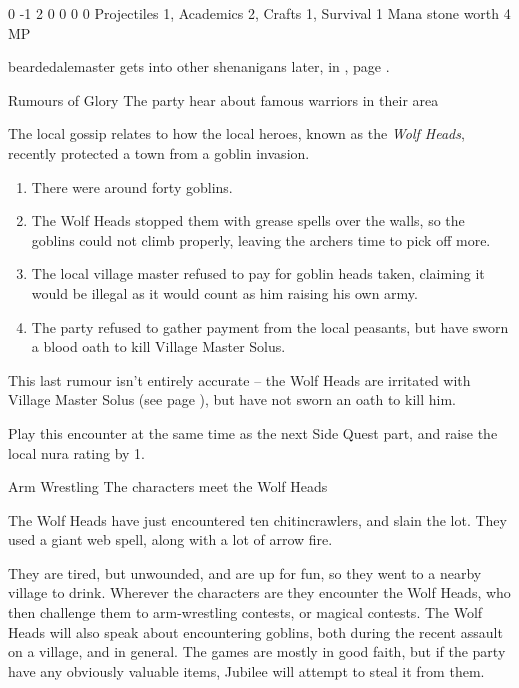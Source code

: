 \begin{multicols}{2}
{0}%
{-1}%
{{2}%
{0}%
{0}}%
{0}%
{0}%
{Projectiles 1, Academics 2, Crafts 1, Survival 1\knacks{\combatcaster}
}%
{Mana stone worth 4 MP}%
{}

\beardedalemaster
\label{beardedalemaster}

\Gls{beardedalemaster} gets into other shenanigans later, in , page \pageref{troubleAle}.

{\N Rumours of Glory}%
{The party hear about famous warriors in their area}%

The local gossip relates to how the local heroes, known as the \textit{Wolf Heads}, recently protected a town from a goblin invasion.

\begin{enumerate}

	\item{There were around forty goblins.}
	\item{The Wolf Heads stopped them with grease spells over the walls, so the goblins could not climb properly, leaving the archers time to pick off more.}
	\item{The local village master refused to pay for goblin heads taken, claiming it would be illegal as it would count as him raising his own army.}
	\item{The party refused to gather payment from the local peasants, but have sworn a blood oath to kill Village Master Solus.}
\end{enumerate}

This last rumour isn't entirely accurate -- the Wolf Heads are irritated with Village Master Solus (see page \pageref{solus}), but have not sworn an oath to kill him.

Play this encounter at the same time as the next Side Quest part, and raise the local nura rating by 1.

{Arm Wrestling}%
{The characters meet the Wolf Heads}%

The Wolf Heads have just encountered ten chitincrawlers, and slain the lot.
They used a giant web spell, along with a lot of arrow fire.

They are tired, but unwounded, and are up for fun, so they went to a nearby village to drink.
Wherever the characters are they encounter the Wolf Heads, who then challenge them to arm-wrestling contests, or magical contests.
The Wolf Heads will also speak about encountering goblins, both during the recent assault on a village, and in general.
The games are mostly in good faith, but if the party have any obviously valuable items, Jubilee will attempt to steal it from them.


\end{multicols}
